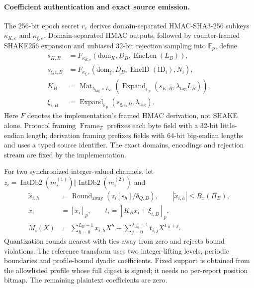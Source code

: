 \paragraph{Coefficient authentication and exact source emission.}
The 256-bit epoch secret $r_e$ derives domain-separated HMAC-SHA3-256 subkeys
$\kappa_{K,e}$ and $\kappa_{\xi,e}$. Domain-separated HMAC outputs, followed by
counter-framed SHAKE256 expansion and unbiased 32-bit rejection sampling into
$\mathbb{F}_p$, define
\begin{equation}
 \begin{aligned}
  s_{K,B}&=F_{\kappa_{K,e}}
       (\mathrm{dom}_K,D_B,\operatorname{EncLen}(L_B)),\\
  s_{\xi,i,B}&=F_{\kappa_{\xi,e}}
       (\mathrm{dom}_{\xi},D_B,\operatorname{EncID}(\mathrm{ID}_i),N_i),\\
  K_B&=\operatorname{Mat}_{\lambda_{\mathrm{tag}}\times L_B}
      (\operatorname{Expand}_{\mathbb{F}_p}
               (s_{K,B},\lambda_{\mathrm{tag}}L_B)),\\
  \xi_{i,B}&=\operatorname{Expand}_{\mathbb{F}_p}
               (s_{\xi,i,B},\lambda_{\mathrm{tag}}).
 \end{aligned}
 \label{eq:daahe_protocol_derivation}
\end{equation}
Here $F$ denotes the implementation's framed HMAC derivation, not SHAKE alone.
Protocol framing $\operatorname{Frame}_T$ prefixes each byte field with a
32-bit little-endian length; derivation framing prefixes fields with 64-bit
big-endian lengths and uses a typed source identifier. The exact domains,
encodings and rejection stream are fixed by the implementation.

For two synchronized integer-valued channels, let
$z_i=\operatorname{IntDb2}(m_i^{(1)})\Vert\operatorname{IntDb2}(m_i^{(2)})$
and
\begin{equation}
 \begin{aligned}
  \widetilde{x}_{i,h}&=\operatorname{Round}_{\mathrm{away}}
               (z_i[s_h]/\delta_{Q,B}),\qquad
               |\widetilde{x}_{i,h}|\leq B_x(\Pi_B),\\
  x_i&=[\widetilde{x}_i]_p,\qquad
  t_i=[K_Bx_i+\xi_{i,B}]_p,\\
  M_i(X)&=\sum_{h=0}^{L_B-1}x_{i,h}X^h+
          \sum_{j=0}^{\lambda_{\mathrm{tag}}-1}t_{i,j}X^{L_B+j}.
 \end{aligned}
 \label{eq:daahe_protocol_packing}
\end{equation}
Quantization rounds nearest with ties away from zero and rejects bound
violations. The reference transform uses two integer-lifting levels, periodic
boundaries and profile-bound dyadic coefficients. Fixed support is obtained from
the allowlisted profile whose full digest is signed; it needs no per-report position bitmap.
The remaining plaintext coefficients are zero.

